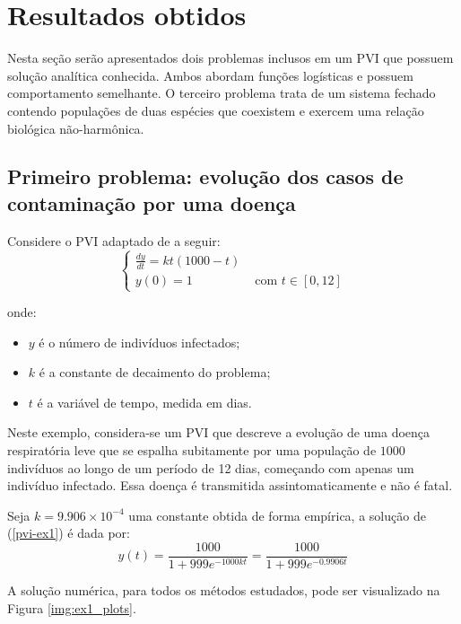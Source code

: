 \section{Resultados obtidos}\label{sec:results}
Nesta seção serão apresentados dois problemas inclusos em um PVI que possuem solução analítica conhecida. Ambos abordam funções logísticas e possuem comportamento semelhante. O terceiro problema trata de um sistema fechado contendo populações de duas espécies que coexistem e exercem uma relação biológica não-harmônica.

\subsection{Primeiro problema: evolução dos casos de contaminação por uma doença} \label{problem-1}\quad
Considere o PVI adaptado de \cite{zill2001} a seguir:
\begin{equation}\label{pvi-ex1}
	\begin{cases}
		\frac{dy}{dt} = kt(1000-t) &                            \\
		y(0) = 1                   & \text{ com } t \in [0, 12] 
	\end{cases}
\end{equation}

onde:
\begin{itemize}
\item $y$ é o número de indivíduos infectados;
\item $k$ é a constante de decaimento do problema;
\item $t$ é a variável de tempo, medida em dias.
\end{itemize}

Neste exemplo, considera-se um PVI que descreve a evolução de uma doença respiratória leve que se espalha subitamente por uma população de $1000$ indivíduos ao longo de um período de 12 dias, começando com apenas um indivíduo infectado. Essa doença é transmitida assintomaticamente e não é fatal.

Seja $k = 9.906 \times 10^{-4}$ uma constante obtida de forma empírica, a solução de (\ref{pvi-ex1}) é dada por:
\begin{equation*}
	y(t) =  \dfrac{1000}{1 + 999e^{-1000kt}} = \dfrac{1000}{1 + 999e^{-0.9906t}}
\end{equation*}

A solução numérica, para todos os métodos estudados, pode ser visualizado na Figura \ref{img:ex1_plots}.

